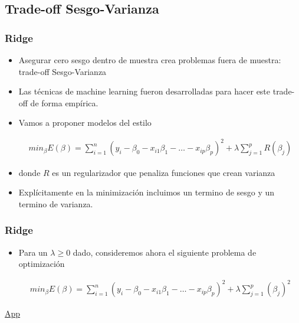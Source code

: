 \documentclass[
  shownotes,
  xcolor={svgnames},
  hyperref={colorlinks,citecolor=DarkBlue,linkcolor=andesred,urlcolor=DarkBlue}
  , aspectratio=169]{beamer}
\begin{document}
\subsection{Trade-off Sesgo-Varianza}
\begin{frame}[fragile]
\frametitle{Ridge}
  \begin{itemize}
    \item Asegurar cero sesgo dentro de muestra crea problemas fuera de muestra: trade-off Sesgo-Varianza
    \medskip
    \item Las técnicas de machine learning fueron desarrolladas para hacer este trade-off de forma empírica.
    \medskip
    \item Vamos a proponer modelos del estilo


\begin{align}
min_{\beta} E(\beta) = \sum_{i=1}^n (y_i-\beta_0 - x_{i1}\beta_1 - \dots - x_{ip}\beta_p)^2 + \lambda \sum_{j=1}^p R(\beta_j)
\end{align}

\item donde $R$ es un regularizador que penaliza funciones que crean varianza
\medskip
\item Explícitamente en la minimización incluimos un termino de sesgo y un termino de varianza.


  \end{itemize}
\end{frame}
\begin{frame}[fragile]
\frametitle{Ridge}

\begin{itemize}
\item Para un $\lambda \geq 0$ dado, consideremos ahora el siguiente problema de optimización


\begin{align}
min_{\beta} E(\beta) = \sum_{i=1}^n (y_i-\beta_0 - x_{i1}\beta_1 - \dots - x_{ip}\beta_p)^2 + \lambda \sum_{j=1}^p (\beta_j)^2
\end{align}



\end{itemize}

\href{https://cede.uniandes.edu.co/OLS/}{App}
\end{frame}
\end{document}
